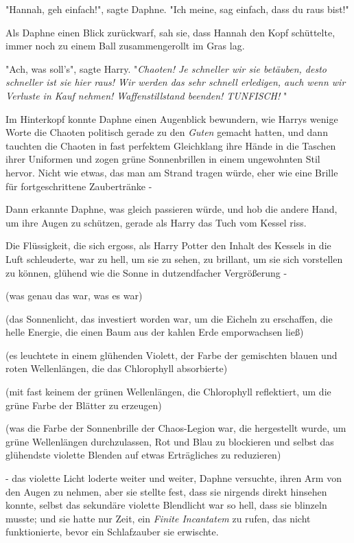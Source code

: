 {"Hannah, geh einfach!", sagte Daphne. "Ich meine, sag einfach, dass du raus bist!"

Als Daphne einen Blick zurückwarf, sah sie, dass Hannah den Kopf schüttelte, immer noch zu einem Ball zusammengerollt im Gras lag.

"Ach, was soll's", sagte Harry. "\emph{Chaoten! Je schneller wir sie betäuben, desto schneller ist sie hier raus! Wir werden das sehr schnell erledigen, auch wenn wir Verluste in Kauf nehmen! Waffenstillstand beenden! TUNFISCH!} "

Im Hinterkopf konnte Daphne einen Augenblick bewundern, wie Harrys wenige Worte die Chaoten politisch gerade zu den \emph{Guten} gemacht hatten, und dann tauchten die Chaoten in fast perfektem Gleichklang ihre Hände in die Taschen ihrer Uniformen und zogen grüne Sonnenbrillen in einem ungewohnten Stil hervor. Nicht wie etwas, das man am Strand tragen würde, eher wie eine Brille für fortgeschrittene Zaubertränke -

Dann erkannte Daphne, was gleich passieren würde, und hob die andere Hand, um ihre Augen zu schützen, gerade als Harry das Tuch vom Kessel riss.

Die Flüssigkeit, die sich ergoss, als Harry Potter den Inhalt des Kessels in die Luft schleuderte, war zu hell, um sie zu sehen, zu brillant, um sie sich vorstellen zu können, glühend wie die Sonne in dutzendfacher Vergrößerung -

(was genau das war, was es war)

(das Sonnenlicht, das investiert worden war, um die Eicheln zu erschaffen, die helle Energie, die einen Baum aus der kahlen Erde emporwachsen ließ)

(es leuchtete in einem glühenden Violett, der Farbe der gemischten blauen und roten Wellenlängen, die das Chlorophyll absorbierte)

(mit fast keinem der grünen Wellenlängen, die Chlorophyll reflektiert, um die grüne Farbe der Blätter zu erzeugen)

(was die Farbe der Sonnenbrille der Chaos-Legion war, die hergestellt wurde, um grüne Wellenlängen durchzulassen, Rot und Blau zu blockieren und selbst das glühendste violette Blenden auf etwas Erträgliches zu reduzieren)

- das violette Licht loderte weiter und weiter, Daphne versuchte, ihren Arm von den Augen zu nehmen, aber sie stellte fest, dass sie nirgends direkt hinsehen konnte, selbst das sekundäre violette Blendlicht war so hell, dass sie blinzeln musste; und sie hatte nur Zeit, ein \emph{Finite Incantatem} zu rufen, das nicht funktionierte, bevor ein Schlafzauber sie erwischte.

}
